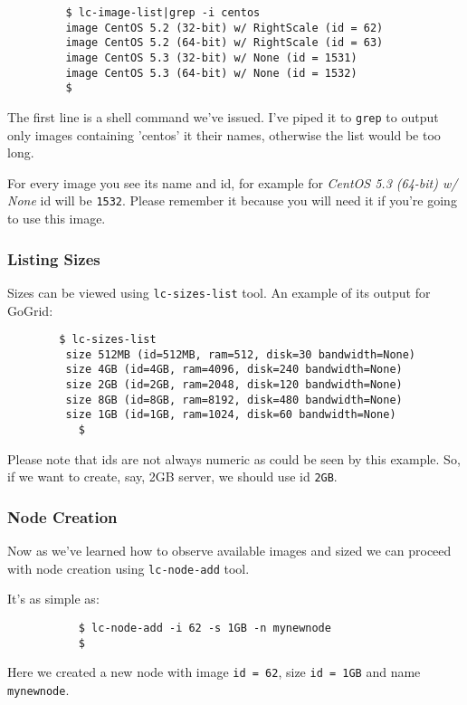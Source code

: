 \documentclass[a4paper]{report}
\begin{document}
		    \begin{verbatim}
		 $ lc-image-list|grep -i centos
		 image CentOS 5.2 (32-bit) w/ RightScale (id = 62)
		 image CentOS 5.2 (64-bit) w/ RightScale (id = 63)
		 image CentOS 5.3 (32-bit) w/ None (id = 1531)
		 image CentOS 5.3 (64-bit) w/ None (id = 1532)
		 $
		    \end{verbatim}

		    The first line is a shell command we've issued. I've piped it to
		 \texttt{grep} to output only images containing 'centos' it their names,
		 otherwise the list would be too long. 

		 For every image you see its name and id, for example for 
		\textit{CentOS 5.3 (64-bit) w/ None} id will be \texttt{1532}. Please
		remember it because you will need it if you're going to use this
		image.

		\subsubsection{Listing Sizes}
		Sizes can be viewed using \texttt{lc-sizes-list} tool. An example of its
		output for GoGrid:

		\begin{verbatim}
		$ lc-sizes-list
	     size 512MB (id=512MB, ram=512, disk=30 bandwidth=None)
	     size 4GB (id=4GB, ram=4096, disk=240 bandwidth=None)
	     size 2GB (id=2GB, ram=2048, disk=120 bandwidth=None)
	     size 8GB (id=8GB, ram=8192, disk=480 bandwidth=None)
	     size 1GB (id=1GB, ram=1024, disk=60 bandwidth=None)
	       $
	       \end{verbatim}

	       Please note that ids are not always numeric as could be seen by this example.
	       So, if we want to create, say, 2GB server, we should use id \texttt{2GB}.

	       \subsubsection{Node Creation}
	       Now as we've learned how to observe available images and sized we can proceed
	       with node creation using \texttt{lc-node-add} tool.

	       It's as simple as:

	       \begin{verbatim}
	       $ lc-node-add -i 62 -s 1GB -n mynewnode
	       $
	       \end{verbatim}

	       Here we created a new node with image \texttt{id = 62}, size
	       \texttt{id = 1GB} and name \texttt{mynewnode}.
\end{document}
